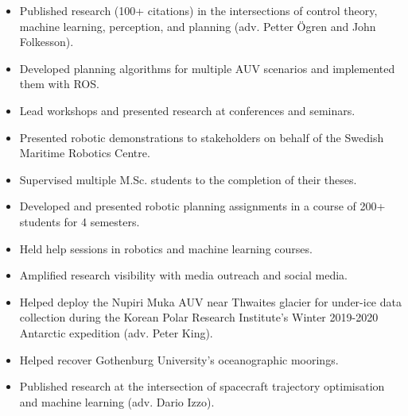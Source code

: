 \documentclass[10pt,a4paper,ragged2e,withhyper]{altacv}
\begin{document}
\begin{paracol}{2}


\begin{itemize}
\item Published research (100+ citations) in the intersections of control theory, machine learning, perception, and planning (adv. Petter \"Ogren and John Folkesson).
\item Developed planning algorithms for multiple AUV scenarios and implemented them with ROS.
\item Lead workshops and presented research at conferences and seminars.
\item Presented robotic demonstrations to stakeholders on behalf of the Swedish Maritime Robotics Centre.
\item Supervised multiple M.Sc. students to the completion of their theses.
\item Developed and presented robotic planning assignments in a course of 200+ students for 4 semesters.
\item Held help sessions in robotics and machine learning courses.
\item Amplified research visibility with media outreach and social media.
\end{itemize}

\divider

\begin{itemize}
\item Helped deploy the Nupiri Muka AUV near Thwaites glacier for under-ice data collection during the Korean Polar Research Institute's Winter 2019-2020 Antarctic expedition (adv. Peter King).
\item Helped recover Gothenburg University's oceanographic moorings. 
\end{itemize}

\divider

\begin{itemize}
  \item Published research at the intersection of spacecraft trajectory optimisation and machine learning (adv. Dario Izzo).
\end{itemize}


\end{paracol}
\end{document}
